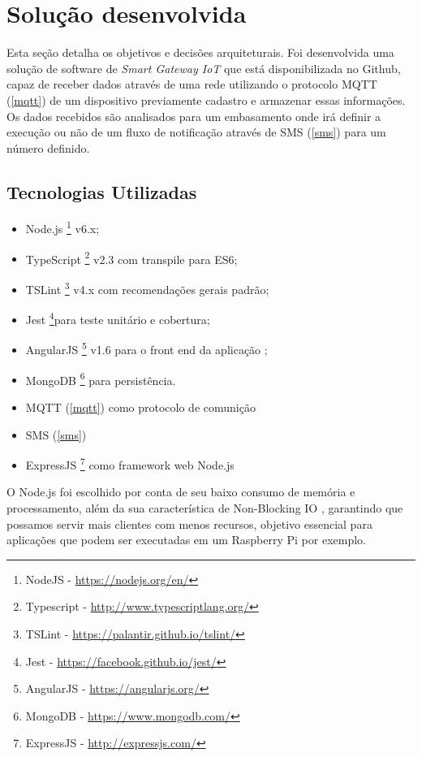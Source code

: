 \section{Solução desenvolvida}
\label{sec:iotGateway}

Esta seção detalha os objetivos e decisões arquiteturais. Foi desenvolvida uma solução de software de \textit{Smart Gateway IoT} que está disponibilizada no Github, capaz de receber dados através de uma rede utilizando o protocolo MQTT	(\ref{mqtt}) de um dispositivo previamente cadastro e armazenar essas informações. Os dados recebidos são analisados para um embasamento onde irá definir a execução ou não de um fluxo de notificação através de SMS (\ref{sms}) para um número definido.

\subsection{Tecnologias Utilizadas} 
\begin{itemize}
	\item Node.js \footnote{NodeJS - \url{https://nodejs.org/en/}} v6.x;
	\item TypeScript \footnote{Typescript - \url{http://www.typescriptlang.org/}} v2.3 com transpile para ES6;
	\item TSLint \footnote{TSLint - \url{https://palantir.github.io/tslint/}} v4.x com recomendações gerais padrão;
	\item Jest \footnote{Jest - \url{https://facebook.github.io/jest/}}para teste unitário e cobertura;
	\item AngularJS \footnote{AngularJS - \url{https://angularjs.org/}} v1.6 para o front end da aplicação ;
	\item MongoDB \footnote{MongoDB - \url{https://www.mongodb.com/}} para persistência.
	\item MQTT (\ref{mqtt}) como protocolo de comunição
	\item SMS (\ref{sms}) 
	\item ExpressJS \footnote{ExpressJS - \url{http://expressjs.com/}} como framework web Node.js 
\end{itemize}

O Node.js foi escolhido por conta de seu baixo consumo de memória e processamento, além da sua característica de Non-Blocking IO \cite{NodeJSNonBlockingIO}, garantindo que possamos servir mais clientes com menos recursos, objetivo essencial para aplicações que podem ser executadas em um Raspberry Pi por exemplo.

